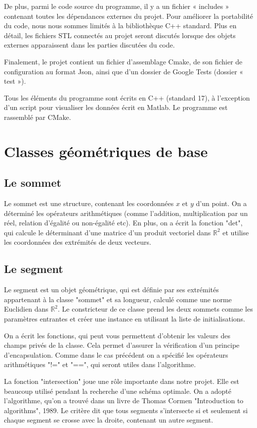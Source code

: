 \documentclass[12pt]{article}
\begin{document}
	De plus, parmi le code source du programme, il y a un fichier « includes » contenant toutes les dépendances externes du projet. Pour améliorer la portabilité du code, nous nous sommes limités à la bibliothèque C++ standard. Plus en détail, les fichiers STL connectés au projet seront discutés lorsque des objets externes apparaissent dans les parties discutées du code.
	
	Finalement, le projet contient un fichier d'assemblage Cmake, de son fichier de configuration au format Json, ainsi que d'un dossier de Google Tests (dossier « test »).
	
	Tous les éléments du programme sont écrits en C++ (standard 17), à l'exception d'un script pour visualiser les données écrit en Matlab. Le programme est rassemblé par CMake.
	\section{Classes géométriques de base}
	\subsection{Le sommet}
	Le sommet est une structure, contenant les coordonnées $x$ et $y$ d'un point. On a déterminé les opérateurs arithmétiques (comme l'addition, multiplication par un réel, relation d'égalité ou non-égalité etc). En plus, on a écrit la fonction "det", qui calcule le déterminant d'une matrice d'un produit vectoriel dans $\mathbb{R}^2$ et utilise les coordonnées des extrémités de deux vecteurs. 
	\subsection{Le segment}
	Le segment est un objet géométrique, qui est définie par ses extrémités appartenant à la classe "sommet" et sa longueur, calculé comme une norme Euclidien dans $\mathbb{R}^2$. Le constricteur  de ce classe prend les deux sommets comme les paramètres entrantes et créer une instance en utilisant la liste de initialisations.
	
	On a écrit les fonctions, qui peut vous permettent d'obtenir les valeurs des champs privés de la classe. Cela permet d'assurer la vérification d'un principe d'encapsulation. Comme dans le cas précédent on a spécifié les opérateurs arithmétiques "!=" et "==", qui seront utiles dans l'algorithme. 
	
	La fonction "intersection" joue une rôle importante dans notre projet. Elle est beaucoup utilisé pendant la recherche d'une schéma optimale. On a adopté l'algorithme, qu'on a trouvé dans un livre de Thomas Cormen "Introduction to algorithms", 1989. Le critère dit que tous segments s'intersecte si et seulement si chaque segment se crosse avec la droite, contenant un autre segment.
	
\end{document}
